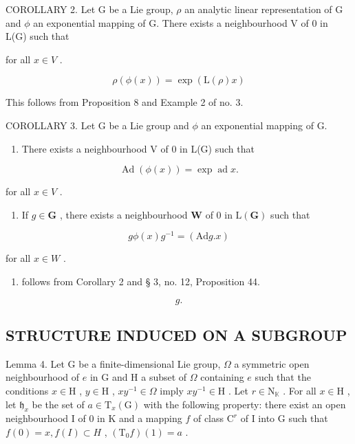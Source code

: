 COROLLARY 2. Let G be a Lie group, \(\rho\) an analytic linear representation of G and \(\phi\) an exponential mapping of G. There exists a neighbourhood V of 0 in L(G) such that

for all \(x \in V\) .

\[
\rho (\phi (x)) = \exp (\mathrm{L} (\rho) x)
\]

This follows from Proposition 8 and Example 2 of no. 3.

COROLLARY 3. Let G be a Lie group and \(\phi\) an exponential mapping of G.

\begin{enumerate}
\def\labelenumi{(\roman{enumi})}
\tightlist
\item
  There exists a neighbourhood V of 0 in L(G) such that
\end{enumerate}

\[
\operatorname{Ad} (\phi (x)) = \exp \operatorname{ad} x.
\]

for all \(x \in V\) .

\begin{enumerate}
\def\labelenumi{(\roman{enumi})}
\setcounter{enumi}{1}
\tightlist
\item
  If \(g \in \mathbf{G}\) , there exists a neighbourhood \(\mathbf{W}\) of 0 in \(\mathrm{L}(\mathbf{G})\) such that
\end{enumerate}

\[
g \phi (x) g ^ {- 1} = (\mathrm{Ad} g. x)
\]

for all \(x \in W\) .

\begin{enumerate}
\def\labelenumi{(\roman{enumi})}
\tightlist
\item
  follows from Corollary 2 and § 3, no. 12, Proposition 44.
\end{enumerate}

\[
g.
\]

\subsection{STRUCTURE INDUCED ON A SUBGROUP}

Lemma 4. Let G be a finite-dimensional Lie group, \(\Omega\) a symmetric open neighbourhood of \(e\) in G and H a subset of \(\Omega\) containing \(e\) such that the conditions \(x \in \mathrm{H}\) , \(y \in \mathrm{H}\) , \(xy^{-1} \in \Omega\) imply \(xy^{-1} \in \mathrm{H}\) . Let \(r \in \mathrm{N}_{\mathbb{K}}\) . For all \(x \in \mathrm{H}\) , let \(\mathfrak{h}_x\) be the set of \(a \in \mathrm{T}_x(\mathrm{G})\) with the following property: there exist an open neighbourhood I of 0 in K and a mapping \(f\) of class \(\mathrm{C}^r\) of I into G such that \(f(0) = x, f(I) \subset H\) , \((\mathrm{T}_0f)(1) = a\) .

